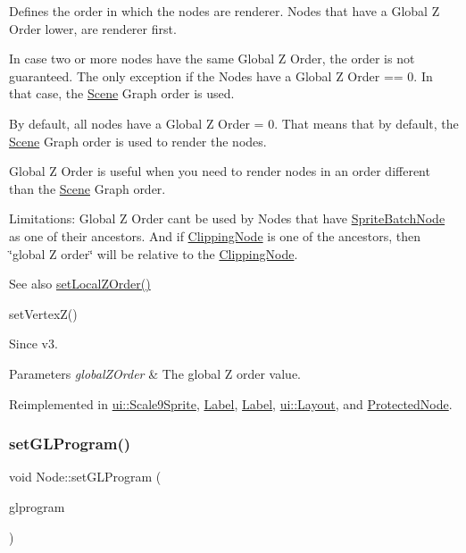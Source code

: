 Defines the order in which the nodes are renderer. Nodes that have a Global Z Order lower, are renderer first.

In case two or more nodes have the same Global Z Order, the order is not guaranteed. The only exception if the Nodes have a Global Z Order == 0. In that case, the \hyperlink{classScene}{Scene} Graph order is used.

By default, all nodes have a Global Z Order = 0. That means that by default, the \hyperlink{classScene}{Scene} Graph order is used to render the nodes.

Global Z Order is useful when you need to render nodes in an order different than the \hyperlink{classScene}{Scene} Graph order.

Limitations\+: Global Z Order can\textquotesingle{}t be used by Nodes that have \hyperlink{classSpriteBatchNode}{Sprite\+Batch\+Node} as one of their ancestors. And if \hyperlink{classClippingNode}{Clipping\+Node} is one of the ancestors, then \char`\"{}global Z order\char`\"{} will be relative to the \hyperlink{classClippingNode}{Clipping\+Node}.

\begin{DoxySeeAlso}{See also}
{\ttfamily \hyperlink{classNode_aee4e616c2d55b722226aae1e68b4946f}{set\+Local\+Z\+Order()}} 

{\ttfamily set\+Vertex\+Z()}
\end{DoxySeeAlso}
\begin{DoxySince}{Since}
v3.
\end{DoxySince}

\begin{DoxyParams}{Parameters}
{\em global\+Z\+Order} & The global Z order value. \\
\hline
\end{DoxyParams}


Reimplemented in \hyperlink{classui_1_1Scale9Sprite_a7347765b62bbd3f21677e25e1ca164a3}{ui\+::\+Scale9\+Sprite}, \hyperlink{classLabel_a8a3965a4546b01df9e3f1302c6ce62dc}{Label}, \hyperlink{classLabel_a0c53017f28f3e1f2c65f3ea7693a69b2}{Label}, \hyperlink{classui_1_1Layout_a5ac5023a3f35c0ba03769ef6794c8537}{ui\+::\+Layout}, and \hyperlink{classProtectedNode_a0d067b9056a934255c7a44a675dc9e92}{Protected\+Node}.

\mbox{\label{classNode_a16ac830f1b38ae931da062c0833b2db0}} 
\subsubsection{\texorpdfstring{set\+G\+L\+Program()}{setGLProgram()}\hspace{0.1cm}{\footnotesize\ttfamily [1/2]}}
{\footnotesize\ttfamily void Node\+::set\+G\+L\+Program (\begin{DoxyParamCaption}\item[{\hyperlink{classGLProgram}{G\+L\+Program} $\ast$}]{glprogram }\end{DoxyParamCaption})\hspace{0.3cm}{\ttfamily [virtual]}}

